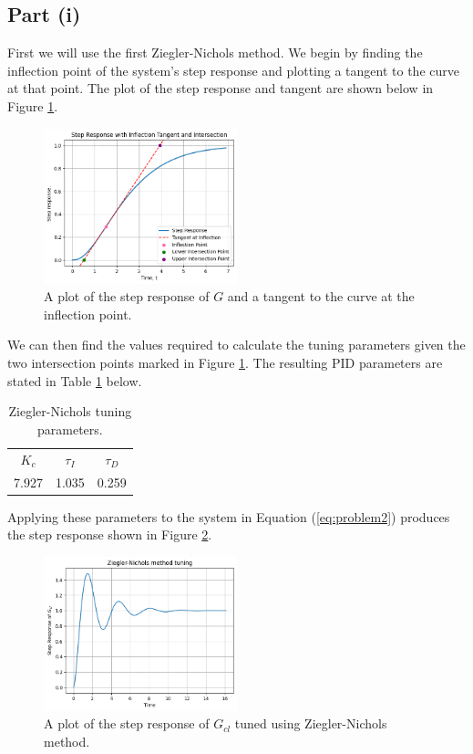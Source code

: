 \documentclass[10pt,a4paper]{article}
\begin{document}
    \subsection{Part (i)}
        First we will use the first Ziegler-Nichols method. We begin by finding the inflection point of the system's step response and plotting a tangent to the curve at that point. The plot of the step response and tangent are shown below in Figure \ref{fig:zn1_tangent}.
        \begin{figure}[h]
            \centering
            \includegraphics[width=0.5\textwidth]{zn1_stepRes+tangent.png}
            \caption{A plot of the step response of $G$ and a tangent to the curve at the inflection point.}
            \label{fig:zn1_tangent}
        \end{figure}
        We can then find the values required to calculate the tuning parameters given the two intersection points marked in Figure \ref{fig:zn1_tangent}. The resulting PID parameters are stated in Table \ref{tb:zn1_params} below.
        \begin{table}[h]
            \centering
            \begin{tabular}{ c | c | c }
                $K_c$ & $\tau_I$ & $\tau_D$ \\
                7.927 & 1.035    & 0.259
            \end{tabular}
            \caption{Ziegler-Nichols tuning parameters.}
            \label{tb:zn1_params}
        \end{table}
        Applying these parameters to the system in Equation (\ref{eq:problem2}) produces the step response shown in Figure \ref{fig:zn1_gcl}.
        \begin{figure}[h]
            \centering
            \includegraphics[width=0.5\textwidth]{zn1_Gcl.png}
            \caption{A plot of the step response of $G_{cl}$ tuned using Ziegler-Nichols method.}
            \label{fig:zn1_gcl}
        \end{figure}
\end{document}
